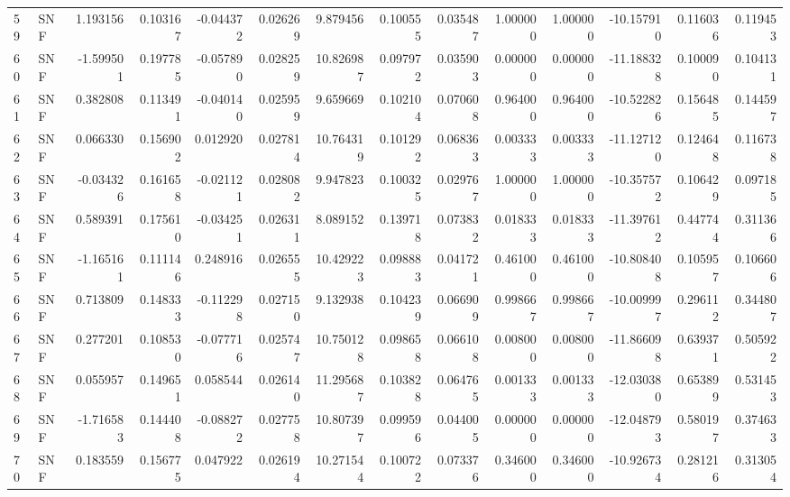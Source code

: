 \begin{tabular}{llrrrrrrrrrrrr}
59  &    SNF &  1.193156 &      0.103167 & -0.044372 &    0.026269 &   9.879456 &      0.100555 &   0.035487 &  1.000000 &  1.000000 & -10.157910 &     0.116036 &     0.119453 \\
60  &    SNF & -1.599501 &      0.197785 & -0.057890 &    0.028259 &  10.826987 &      0.097972 &   0.035903 &  0.000000 &  0.000000 & -11.188328 &     0.100090 &     0.104131 \\
61  &    SNF &  0.382808 &      0.113491 & -0.040140 &    0.025959 &   9.659669 &      0.102104 &   0.070608 &  0.964000 &  0.964000 & -10.522826 &     0.156485 &     0.144597 \\
62  &    SNF &  0.066330 &      0.156902 &  0.012920 &    0.027814 &  10.764319 &      0.101292 &   0.068363 &  0.003333 &  0.003333 & -11.127120 &     0.124648 &     0.116738 \\
63  &    SNF & -0.034326 &      0.161658 & -0.021121 &    0.028082 &   9.947823 &      0.100325 &   0.029767 &  1.000000 &  1.000000 & -10.357572 &     0.106429 &     0.097185 \\
64  &    SNF &  0.589391 &      0.175610 & -0.034251 &    0.026311 &   8.089152 &      0.139718 &   0.073832 &  0.018333 &  0.018333 & -11.397612 &     0.447744 &     0.311366 \\
65  &    SNF & -1.165161 &      0.111146 &  0.248916 &    0.026555 &  10.429223 &      0.098883 &   0.041721 &  0.461000 &  0.461000 & -10.808408 &     0.105957 &     0.106606 \\
66  &    SNF &  0.713809 &      0.148333 & -0.112298 &    0.027150 &   9.132938 &      0.104239 &   0.066909 &  0.998667 &  0.998667 & -10.009997 &     0.296112 &     0.344807 \\
67  &    SNF &  0.277201 &      0.108530 & -0.077716 &    0.025747 &  10.750128 &      0.098658 &   0.066108 &  0.008000 &  0.008000 & -11.866098 &     0.639371 &     0.505922 \\
68  &    SNF &  0.055957 &      0.149651 &  0.058544 &    0.026140 &  11.295687 &      0.103828 &   0.064765 &  0.001333 &  0.001333 & -12.030380 &     0.653899 &     0.531453 \\
69  &    SNF & -1.716583 &      0.144408 & -0.088272 &    0.027758 &  10.807397 &      0.099596 &   0.044005 &  0.000000 &  0.000000 & -12.048793 &     0.580197 &     0.374633 \\
70  &    SNF &  0.183559 &      0.156775 &  0.047922 &    0.026194 &  10.271544 &      0.100722 &   0.073376 &  0.346000 &  0.346000 & -10.926734 &     0.281216 &     0.313054 \\

\end{tabular}

